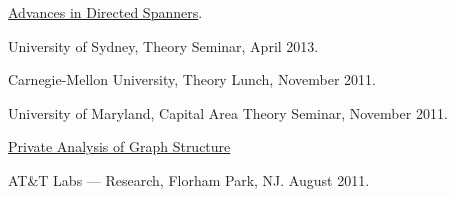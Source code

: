 \documentclass[11pt]{article}
\newenvironment{innerlist}[1][\enskip\textbullet]%
        {\begin{compactitem}[#1]}{\end{compactitem}}
\begin{document}
\begin{innerlist}
\item \href{http://grigory.us/files/talks/AdvancesInDirectedSpanners.pdf}{Advances in Directed Spanners}.
\begin{innerlist}
\item University of Sydney, Theory Seminar, April 2013.
\item Carnegie-Mellon University, Theory Lunch, November 2011.
\item University of Maryland, Capital Area Theory Seminar, November 2011.
\end{innerlist}

\item \href{http://grigory.us/files/talks/KRSY-VLDB11.pptx}{Private Analysis of Graph Structure}
\begin{innerlist}
  \item AT\&T Labs --- Research, Florham Park, NJ. August 2011.
\end{innerlist}

\begin{comment}
\item Introduction to Property Testing
\begin{innerlist}
\item St. Petersburg Department of V.A. Steklov Institute of Mathematics of the Russian Academy of Sciences. December 2012.
\item St. Petersburg Institute of Fine Mechanics and Optics. Theory Seminar. December 2012.
\end{innerlist}

\item \href{http://grigory.us/talsk/DPIntro.pptx}{Introduction to Differential Privacy} (based on slides by Adam D. Smith).
\begin{innerlist}
\item St. Petersburg Department of Steklov Institute of Mathematics, Computer Science Club, May 2011.
\end{innerlist}

\item Property Testing and Communication Complexity
\begin{innerlist}
\item Moscow State University. Kolmogorov Seminar. May 2011.
\end{innerlist}
\end{comment}


\end{innerlist}
\end{document}
